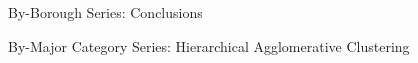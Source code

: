 \documentclass[12pt]{beamer}
\begin{document}
        \begin{frame}{By-Borough Series: Conclusions}

        \end{frame}

        \begin{frame}{By-Major Category Series: Hierarchical Agglomerative Clustering}
            \begin{figure}
                \centering
            \end{figure}
        \end{frame}
\end{document}
